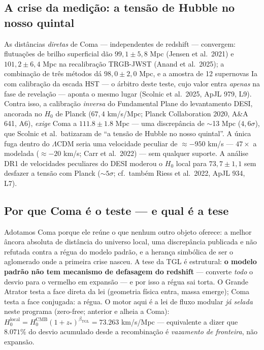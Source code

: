\documentclass[11pt]{article}
\newcommand{\bTGL}{\beta_{\mathrm{TGL}}}\newcommand{\Msun}{M_{\odot}}\newcommand{\TGL}{\mathrm{TGL}}
\theoremstyle{definition}\newtheorem{deriv}{Derivação}
\begin{document}
\subsection*{A crise da medição: a tensão de Hubble no nosso quintal}

As distâncias \emph{diretas} de Coma --- independentes de redshift --- convergem: flutuações de brilho superficial dão $99{,}1\pm5{,}8$ Mpc (Jensen et al.\ 2021) e $101{,}2\pm6{,}4$ Mpc na recalibração TRGB-JWST (Anand et al.\ 2025); a combinação de três métodos dá $98{,}0\pm2{,}0$ Mpc, e a amostra de 12 supernovas Ia com calibração da escada HST --- o árbitro deste teste, cujo valor entra \emph{apenas} na fase de revelação --- aponta o mesmo lugar (Scolnic et al.\ 2025, ApJL 979, L9). Contra isso, a calibração \emph{inversa} do Fundamental Plane do levantamento DESI, ancorada no $H_0$ de Planck ($67{,}4$ km/s/Mpc; Planck Collaboration 2020, A\&A 641, A6), \emph{exige} Coma a $111.8\pm1.8$ Mpc --- uma discrepância de $\sim$13 Mpc ($4{,}6\sigma$), que Scolnic et al.\ batizaram de ``a tensão de Hubble no nosso quintal''. A única fuga dentro do $\Lambda$CDM seria uma velocidade peculiar de $\approx-950$ km/s --- $47\times$ a modelada ($\approx-20$ km/s; Carr et al.\ 2022) --- sem qualquer suporte. A análise DR1 de velocidades peculiares do DESI moderou o $H_0$ local para $73{,}7\pm1{,}1$ sem desfazer a tensão com Planck ($\sim5\sigma$; cf.\ também Riess et al.\ 2022, ApJL 934, L7).

\subsection*{Por que Coma é o teste --- e qual é a tese}

Adotamos Coma porque ele reúne o que nenhum outro objeto oferece: a melhor âncora absoluta de distância do universo local, uma discrepância publicada e não refutada contra a régua do modelo padrão, e a herança simbólica de ser o aglomerado onde a primeira crise nasceu. A tese da TGL é estrutural: \textbf{o modelo padrão não tem mecanismo de defasagem do redshift} --- converte \emph{todo} o desvio para o vermelho em expansão --- e por isso a régua sai torta. O Grande Atrator testa a face direta da lei (geometria física entra, massa emerge); Coma testa a face conjugada: a régua. O motor aqui é a lei de fluxo modular \emph{já selada} neste programa (zero-free; anterior e alheia a Coma): $H_0^{\mathrm{local}}=H_0^{\mathrm{CMB}}(1+z_*)^{\bTGL}=73.263$ km/s/Mpc --- equivalente a dizer que $8.071\%$ do desvio acumulado desde a recombinação é \emph{vazamento de fronteira}, não expansão.
\end{document}

